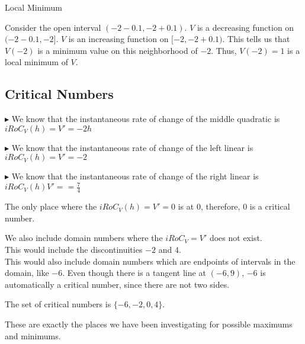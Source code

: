 \documentclass{ximera}
\begin{document}
\begin{explanation} Local Minimum


Consider the open interval $(-2 - 0.1, -2 + 0.1)$. $V$ is a decreasing function on $(-2 - 0.1, -2]$. $V$ is an increasing function on $[-2, -2 + 0.1)$.  This tells us that $V(-2)$ is a minimum value on this neighborhood of $-2$.  Thus, $V(-2) = 1$ is a local minimum of $V$.





\end{explanation}









\subsection*{Critical Numbers} 


$\blacktriangleright$ We know that the instantaneous rate of change of the middle quadratic is $iRoC_V(h) = V' = -2h$ 

$\blacktriangleright$ We know that the instantaneous rate of change of the left linear is $iRoC_V(h) = V' = -2$

$\blacktriangleright$ We know that the instantaneous rate of change of the right linear is $iRoC_V(h) V' = = \frac{7}{4}$



The only place where the $iRoC_V(h) = V' = 0$ is at $0$, therefore, $0$ is a critical number.


We also include domain numbers where the $iRoC_V = V'$ does not exist.  \\

This would include the discontinuities $-2$ and $4$. \\


This would also include domain numbers which are endpoints of intervals in the domain, like $-6$. Even though there is a tangent line at $(-6, 9)$, $-6$ is automatically a critical number, since there are not two sides.



The set of critical numbers is $\{ -6, -2, 0, 4 \}$.




These are exactly the places we have been investigating for possible maximums and minimums.
\end{document}
